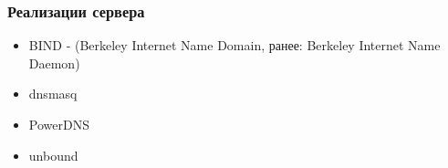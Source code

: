 \begin{frame}
    \frametitle{Реализации сервера}
    \begin{itemize}
        \item \alert{BIND} -  (Berkeley Internet Name Domain, ранее: Berkeley Internet Name Daemon)
        \item \alert{dnsmasq}
        \item \alert{PowerDNS}
        \item \alert{unbound}
    \end{itemize}

\end{frame}